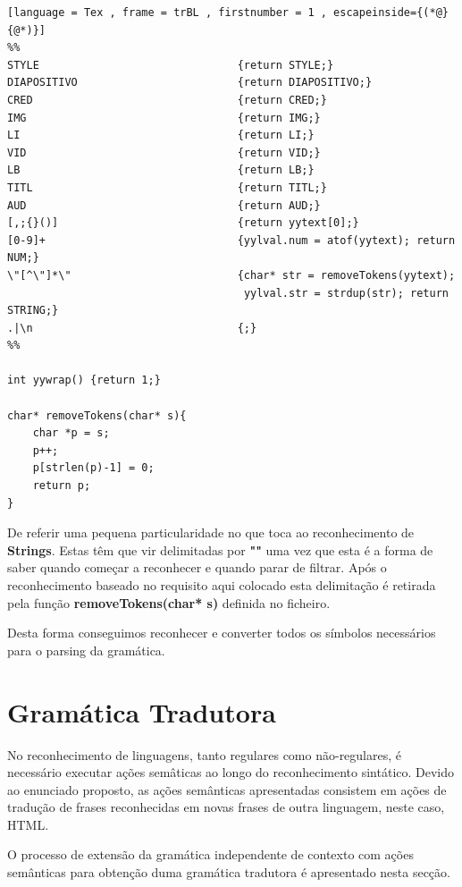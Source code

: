 \documentclass[11pt,a4paper]{report}
\begin{document}
\begin{lstlisting}[language = Tex , frame = trBL , firstnumber = 1 , escapeinside={(*@}{@*)}]
%%
STYLE                               {return STYLE;}
DIAPOSITIVO                         {return DIAPOSITIVO;}
CRED                                {return CRED;}
IMG                                 {return IMG;}
LI                                  {return LI;}
VID                                 {return VID;}
LB                                  {return LB;}
TITL                                {return TITL;}
AUD                                 {return AUD;}
[,;{}()]                            {return yytext[0];}
[0-9]+                              {yylval.num = atof(yytext); return NUM;}
\"[^\"]*\"                          {char* str = removeTokens(yytext);
				      				 yylval.str = strdup(str); return STRING;}
.|\n                                {;}
%%

int yywrap() {return 1;}

char* removeTokens(char* s){
    char *p = s;
    p++;
    p[strlen(p)-1] = 0;
    return p;
}
\end{lstlisting}

\vspace{0.5cm}

De referir uma pequena particularidade no que toca ao reconhecimento de \textbf{Strings}. Estas têm que vir delimitadas por \textbf{""} uma vez que esta é a forma de saber quando começar a reconhecer e quando parar de filtrar. Após o reconhecimento baseado no requisito aqui colocado esta delimitação é retirada pela função \textbf{removeTokens(char* s)} definida no ficheiro.

Desta forma conseguimos reconhecer e converter todos os símbolos necessários para o parsing da gramática.



\section{Gramática Tradutora}

No reconhecimento de linguagens, tanto regulares como não-regulares, é necessário executar ações semâticas ao longo do reconhecimento sintático. Devido ao enunciado proposto, as ações semânticas apresentadas consistem em ações de tradução de frases reconhecidas em novas frases de outra linguagem, neste caso, HTML.

O processo de extensão da gramática independente de contexto com ações semânticas para obtenção duma gramática tradutora é apresentado nesta secção.
\end{document}
